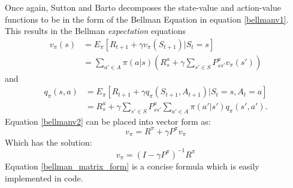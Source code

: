 Once again, Sutton and Barto \cite{sutton_barto} decomposes the state-value and action-value functions to be in the form of the Bellman Equation in equation \ref{bellmanv1}. This results in the Bellman \textit{expectation} equations
\begin{align}
	v_{\pi}(s)	&= E_{\pi}[R_{t+1} + \gamma v_{\pi}(S_{t+1})|S_t = s]\\
	&= \sum_{a'\in A}\pi(a|s)(R^{a}_s+\gamma\sum_{s'\in S}P^{a}_{ss'}v_\pi(s'))
	\label{bellmanv2}
\end{align}
and
\begin{align}
	q_{\pi}(s,a)	&= E_{\pi}[R_{t+1} + \gamma q_{\pi}(S_{t+1},A_{t+1})|S_t = s,A_t = a]\\
	&= R^{a}_s +\gamma \sum_{s'\in S}P^{a}_{ss'}\sum_{a'\in A}\pi(a'|s')q_\pi(s',a').
	\label{bellmanq}
\end{align}
Equation \ref{bellmanv2} can be placed into vector form as:
\begin{equation}
	v_\pi = R^{\pi} + \gamma P^{\pi}v_\pi
\end{equation}
Which has the solution:
\begin{equation}
	v_\pi = (I - \gamma P^{\pi})^{-1}R^{\pi}
	\label{bellman_matrix_form}
\end{equation}
Equation \ref{bellman_matrix_form} is a concise formula which is easily implemented in code.

